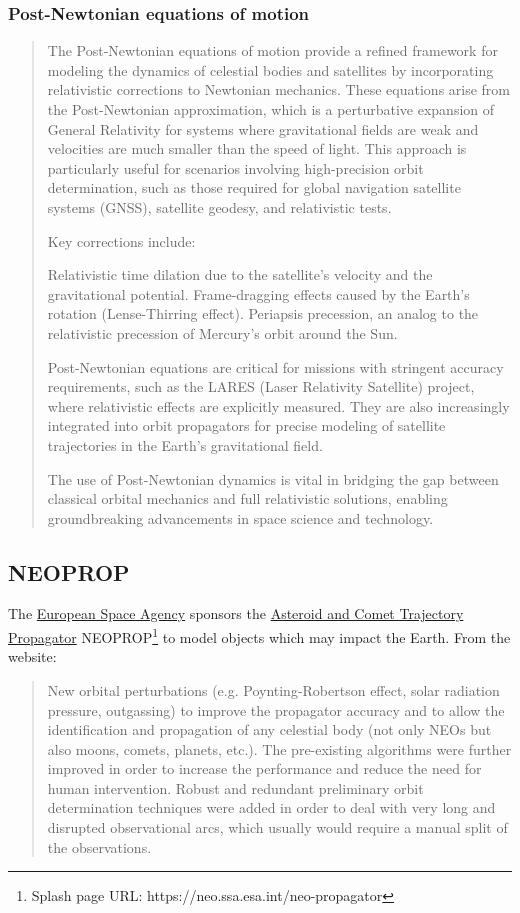 \subsubsection{Post-Newtonian equations of motion}
\begin{quotation}
The Post-Newtonian equations of motion provide a refined framework for modeling the dynamics of celestial bodies and satellites by incorporating relativistic corrections to Newtonian mechanics. These equations arise from the Post-Newtonian approximation, which is a perturbative expansion of General Relativity for systems where gravitational fields are weak and velocities are much smaller than the speed of light. This approach is particularly useful for scenarios involving high-precision orbit determination, such as those required for global navigation satellite systems (GNSS), satellite geodesy, and relativistic tests.

Key corrections include:

    Relativistic time dilation due to the satellite's velocity and the gravitational potential.
    Frame-dragging effects caused by the Earth's rotation (Lense-Thirring effect).
    Periapsis precession, an analog to the relativistic precession of Mercury's orbit around the Sun.

Post-Newtonian equations are critical for missions with stringent accuracy requirements, such as the LARES (Laser Relativity Satellite) project, where relativistic effects are explicitly measured. They are also increasingly integrated into orbit propagators for precise modeling of satellite trajectories in the Earth's gravitational field.

The use of Post-Newtonian dynamics is vital in bridging the gap between classical orbital mechanics and full relativistic solutions, enabling groundbreaking advancements in space science and technology.
\end{quotation}


\subsection{NEOPROP}
The \href{https://neo.ssa.esa.int/}{European Space Agency} sponsors the \href{https://neo.ssa.esa.int/neo-propagator}{Asteroid and Comet Trajectory Propagator} NEOPROP\footnote{Splash page URL: https://neo.ssa.esa.int/neo-propagator} to model objects which may impact the Earth.
From the website:
\begin{quotation}
New orbital perturbations (e.g. Poynting-Robertson effect, solar radiation pressure, outgassing) to improve the propagator accuracy and to allow the identification and propagation of any celestial body (not only NEOs but also moons, comets, planets, etc.).
The pre-existing algorithms were further improved in order to increase the performance and reduce the need for human intervention. Robust and redundant preliminary orbit determination techniques were added in order to deal with very long and disrupted observational arcs, which usually would require a manual split of the observations. 
\end{quotation}

